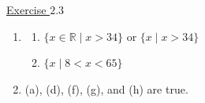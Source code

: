 \underline{Exercise $2.3$} 

\begin{enumerate}
\item \begin{enumerate}
	\item $ \{x \in \mathbb{R} \mid x>34\}$ or  $\{x \mid x>34\} $
	\item $\{x \mid 8<x<65\}$ 
\end{enumerate}
\item (a), (d), (f), (g), and (h) are true. 
\end{enumerate}

